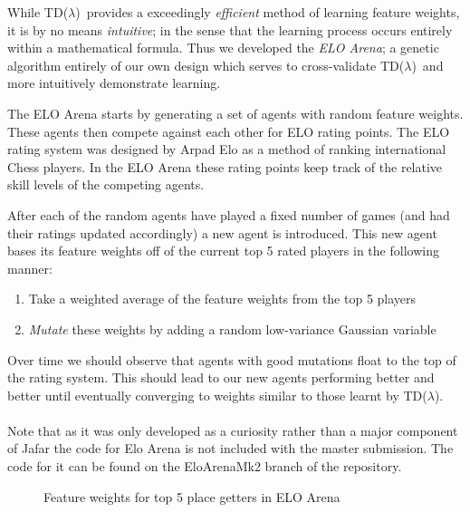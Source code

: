 \documentclass[11pt]{article}
\newcommand{\tdl}{TD($\lambda$)}
\begin{document}
While \tdl\ provides a exceedingly \emph{efficient} method of learning feature weights,
it is by no means \emph{intuitive}; in the sense that the learning process occurs
entirely within a mathematical formula. Thus we developed the \emph{ELO Arena};
a genetic algorithm entirely of our own design which serves to cross-validate
\tdl\ and more intuitively demonstrate learning.

The ELO Arena starts by generating a set of agents with random feature weights.
These agents then compete against each other for ELO rating points. The ELO rating
system was designed by Arpad Elo as a method of ranking international Chess players.
In the ELO Arena these rating points keep track of the relative skill levels of the competing
agents.

After each of the random agents have played a fixed number of games (and had their
ratings updated accordingly) a new agent is introduced. This new agent bases its feature
weights off of the current top 5 rated players in the following manner:
\begin{enumerate}
\item Take a weighted average of the feature weights from the top 5 players
\item \emph{Mutate} these weights by adding a random low-variance Gaussian variable
\end{enumerate}

Over time we should observe that agents with good mutations float to the top of the rating system.
This should lead to our new agents performing better and better until eventually
converging to weights similar to those learnt by \tdl.\\\\

Note that as it was only developed as a curiosity rather than a major component of
Jafar the code for Elo Arena is not included with the master submission. The code
for it can be found on the EloArenaMk2 branch of the repository.

\begin{figure}[htbp]
  \centering
  \caption{Feature weights for top 5 place getters in ELO Arena}
  \label{fig:elo_arena_weights}
\end{figure}
\end{document}
